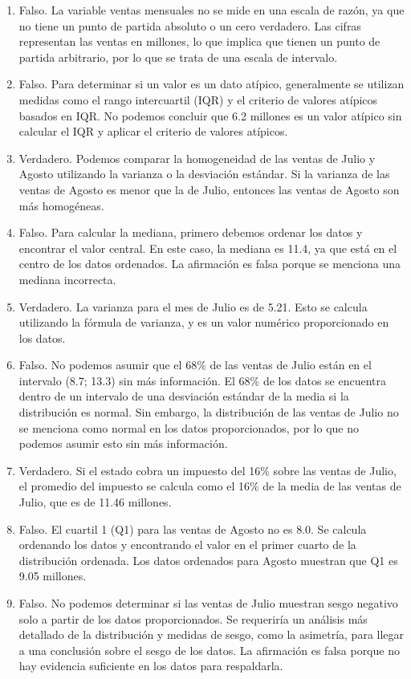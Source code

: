 \documentclass[
]{article}
\begin{document}
\begin{enumerate}
\def\labelenumi{\alph{enumi}.}
\item
  Falso. La variable ventas mensuales no se mide en una escala de razón,
  ya que no tiene un punto de partida absoluto o un cero verdadero. Las
  cifras representan las ventas en millones, lo que implica que tienen
  un punto de partida arbitrario, por lo que se trata de una escala de
  intervalo.
\item
  Falso. Para determinar si un valor es un dato atípico, generalmente se
  utilizan medidas como el rango intercuartil (IQR) y el criterio de
  valores atípicos basados en IQR. No podemos concluir que 6.2 millones
  es un valor atípico sin calcular el IQR y aplicar el criterio de
  valores atípicos.
\item
  Verdadero. Podemos comparar la homogeneidad de las ventas de Julio y
  Agosto utilizando la varianza o la desviación estándar. Si la varianza
  de las ventas de Agosto es menor que la de Julio, entonces las ventas
  de Agosto son más homogéneas.
\item
  Falso. Para calcular la mediana, primero debemos ordenar los datos y
  encontrar el valor central. En este caso, la mediana es 11.4, ya que
  está en el centro de los datos ordenados. La afirmación es falsa
  porque se menciona una mediana incorrecta.
\item
  Verdadero. La varianza para el mes de Julio es de 5.21. Esto se
  calcula utilizando la fórmula de varianza, y es un valor numérico
  proporcionado en los datos.
\item
  Falso. No podemos asumir que el 68\% de las ventas de Julio están en
  el intervalo (8.7; 13.3) sin más información. El 68\% de los datos se
  encuentra dentro de un intervalo de una desviación estándar de la
  media si la distribución es normal. Sin embargo, la distribución de
  las ventas de Julio no se menciona como normal en los datos
  proporcionados, por lo que no podemos asumir esto sin más información.
\item
  Verdadero. Si el estado cobra un impuesto del 16\% sobre las ventas de
  Julio, el promedio del impuesto se calcula como el 16\% de la media de
  las ventas de Julio, que es de 11.46 millones.
\item
  Falso. El cuartil 1 (Q1) para las ventas de Agosto no es 8.0. Se
  calcula ordenando los datos y encontrando el valor en el primer cuarto
  de la distribución ordenada. Los datos ordenados para Agosto muestran
  que Q1 es 9.05 millones.
\item
  Falso. No podemos determinar si las ventas de Julio muestran sesgo
  negativo solo a partir de los datos proporcionados. Se requeriría un
  análisis más detallado de la distribución y medidas de sesgo, como la
  asimetría, para llegar a una conclusión sobre el sesgo de los datos.
  La afirmación es falsa porque no hay evidencia suficiente en los datos
  para respaldarla.
\end{enumerate}
\end{document}
